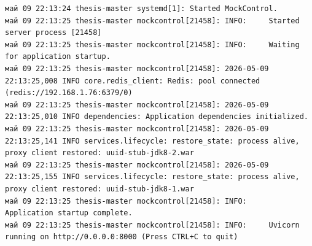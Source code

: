 \clearpage
\begin{listing}[H]
\caption{Сценарий~1. Журнал службы mockcontrol: завершение процедуры restore\_state -- все заглушки успешно подтверждены}
\label{lst:restore-ok-log}
\begin{mdframed}
\begin{verbatim}
май 09 22:13:24 thesis-master systemd[1]: Started MockControl.
май 09 22:13:25 thesis-master mockcontrol[21458]: INFO:     Started server process [21458]
май 09 22:13:25 thesis-master mockcontrol[21458]: INFO:     Waiting for application startup.
май 09 22:13:25 thesis-master mockcontrol[21458]: 2026-05-09 22:13:25,008 INFO core.redis_client: Redis: pool connected (redis://192.168.1.76:6379/0)
май 09 22:13:25 thesis-master mockcontrol[21458]: 2026-05-09 22:13:25,010 INFO dependencies: Application dependencies initialized.
май 09 22:13:25 thesis-master mockcontrol[21458]: 2026-05-09 22:13:25,141 INFO services.lifecycle: restore_state: process alive, proxy client restored: uuid-stub-jdk8-2.war
май 09 22:13:25 thesis-master mockcontrol[21458]: 2026-05-09 22:13:25,155 INFO services.lifecycle: restore_state: process alive, proxy client restored: uuid-stub-jdk8-1.war
май 09 22:13:25 thesis-master mockcontrol[21458]: INFO:     Application startup complete.
май 09 22:13:25 thesis-master mockcontrol[21458]: INFO:     Uvicorn running on http://0.0.0.0:8000 (Press CTRL+C to quit)
\end{verbatim}
\end{mdframed}
\end{listing}


